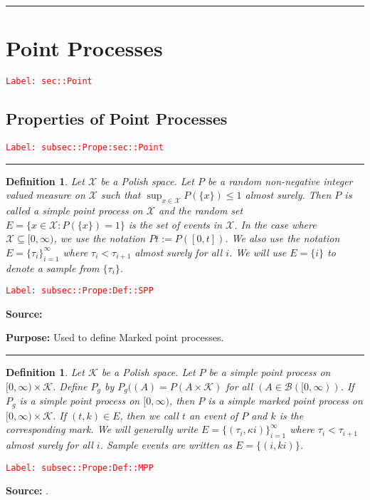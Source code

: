 \documentclass[12pt]{article}
\newcommand{\mc}{\mathcal}
\newcommand{\ms}{\mathscr}
\newcommand{\tr}{\textcolor{red}}
\newcommand{\labe}[1]{\tr{\texttt{Label: #1}}}
\newcommand{\purpose}{\textbf{Purpose: }}
\newcommand{\lin}{\rule{\linewidth}{0.4 pt}}
\newcommand{\x}{x}								%
\renewcommand{\t}{t}							%
\newcommand{\indx}[1]{_{#1}}					%
\newcommand{\rt}{\tau}							%
\renewcommand{\mark}{\kappa}					%
\newcommand{\rp}{P}								%
\newcommand{\typset}{A}							%
\newcommand{\spce}{\mc{X}}						%
\newcommand{\evs}{E}							%
\newcommand{\mspce}{\mc{K}}						%
\newcommand{\rpg}{\rp_g}						%
\newtheorem{defn}[thms]{Definition}
\begin{document}
\lin 

\section{Point Processes}
\label{sec::Point}\labe{sec::Point}

\subsection{Properties of Point Processes}
\label{subsec::Prope:sec::Point}\labe{subsec::Prope:sec::Point}

\lin

\begin{defn}
Let \(\spce\) be a Polish space. Let \(\rp\) be a random non-negative integer valued measure on \(\spce\) such that \(\sup_{\x \in \spce} \rp(\{\x\})\leq 1\) almost surely. Then \(\rp\) is called a simple point process on \(\spce\) and the random set \(E = \{\x \in \spce: \rp(\{\x\}) = 1\}\) is the set of events in \(\spce\). In the case where \(\spce \subseteq [0,\infty)\), we use the notation \(\rp{\t} := \rp([0,\t])\). We also use the notation \(\evs = \{\rt\indx{i}\}_{i=1}^{\infty}\) where \(\rt\indx{i} < \rt\indx{i+1}\) almost surely for all \(i\). We will use \(\evs = \{	{i}\}\) to denote a sample from \(\{\rt\indx{i}\}\).
\label{subsec::Prope:Def::SPP}
\end{defn}
\labe{subsec::Prope:Def::SPP}

\textbf{Source: }\cite[Definition 9.1.II]{DalVer08}

\purpose Used to define Marked point processes.

\lin

\begin{defn}
Let \(\mspce\) be a Polish space. Let \(\rp\) be a simple point process on \([0,\infty)\times \mspce\). Define \(\rpg\) by \(\rpg((\typset) = \rp(\typset\times \mspce)\) for all \((\typset \in \ms{B}([0,\infty))\). If \(\rpg\) is a simple point process on \([0,\infty)\), then \(\rp\) is a simple marked point process on \([0,\infty)\times \mspce\). If \((\t,k) \in \evs\), then we call \(\t\) an event of \(\rp\) and \(k\) is the corresponding mark. We will generally write \(\evs = \{(\rt\indx{i},\mark{i})\}_{i=1}^{\infty}\) where \(\rt\indx{i} < \rt\indx{i+1}\) almost surely for all \(i\). Sample events are written as \(\evs = \{(	{i},k{i})\}\). 
\label{subsec::Prope:Def::MPP}
\end{defn}
\labe{subsec::Prope:Def::MPP}

\textbf{Source: }\cite[Definition 6.4.I]{DalVer03}.
\end{document}
